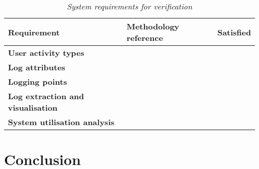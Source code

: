 \begin{table}[!htb]
	\centering
	\caption[System requirements for verification]
	{\textit{System requirements for verification}}
	\label{tbl:ch2_verification}
	\begin{tabularx}{\textwidth}{|X|X|c|}
		\hline \textbf{Requirement} & \textbf{Methodology reference} & \textbf{Satisfied} \\
		\hline \textbf{User activity types} &  & \cmark \\
		\hline \textbf{Log attributes} & & \cmark \\
		\hline \textbf{Logging points} &  & \cmark \\
		\hline \textbf{Log extraction and visualisation} &  & \cmark \\
		\hline \textbf{System utilisation analysis} &  & \cmark \\
		\hline
	\end{tabularx}
\end{table}

\section{Conclusion}
